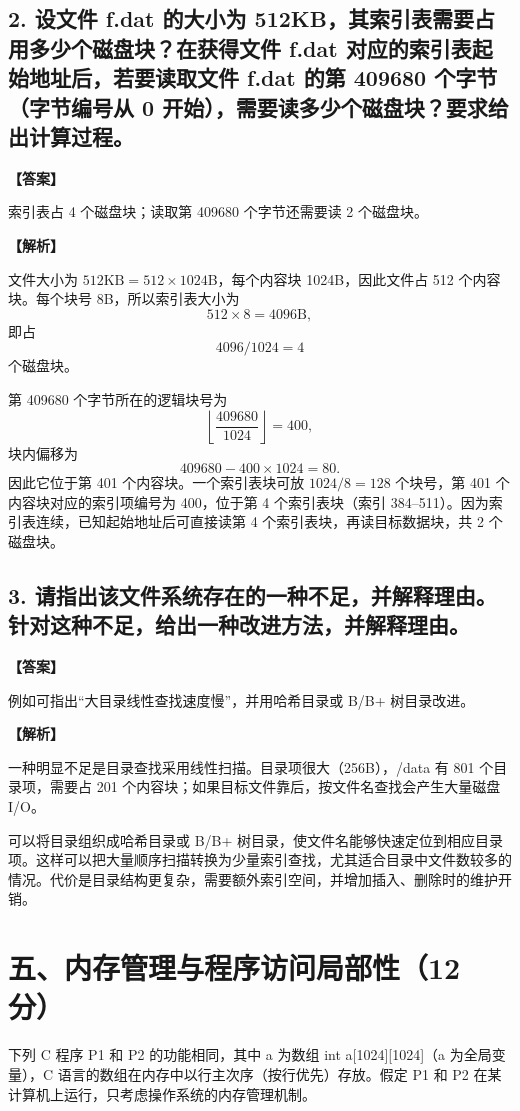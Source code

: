 \documentclass[UTF8,12pt]{ctexart}
\newenvironment{explanation}{\par\noindent\textbf{【解析】}\par\smallskip}{\par\medskip}
\newenvironment{answer}{\par\noindent\textbf{【答案】}\par\smallskip}{\par}
\begin{document}
\subsection*{2. 设文件 f.dat 的大小为 512KB，其索引表需要占用多少个磁盘块？在获得文件 f.dat 对应的索引表起始地址后，若要读取文件 f.dat 的第 409680 个字节（字节编号从 0 开始），需要读多少个磁盘块？要求给出计算过程。}
\begin{answer}
索引表占 4 个磁盘块；读取第 409680 个字节还需要读 2 个磁盘块。
\end{answer}

\begin{explanation}
文件大小为 $512\text{KB}=512\times1024$B，每个内容块 1024B，因此文件占 512 个内容块。每个块号 8B，所以索引表大小为
\[
512\times8=4096\text{B},
\]
即占
\[
4096/1024=4
\]
个磁盘块。

第 409680 个字节所在的逻辑块号为
\[
\left\lfloor\frac{409680}{1024}\right\rfloor=400,
\]
块内偏移为
\[
409680-400\times1024=80.
\]
因此它位于第 401 个内容块。一个索引表块可放 $1024/8=128$ 个块号，第 401 个内容块对应的索引项编号为 400，位于第 4 个索引表块（索引 384--511）。因为索引表连续，已知起始地址后可直接读第 4 个索引表块，再读目标数据块，共 2 个磁盘块。
\end{explanation}
\subsection*{3. 请指出该文件系统存在的一种不足，并解释理由。针对这种不足，给出一种改进方法，并解释理由。}
\begin{answer}
例如可指出“大目录线性查找速度慢”，并用哈希目录或 B/B+ 树目录改进。
\end{answer}

\begin{explanation}
一种明显不足是目录查找采用线性扫描。目录项很大（256B），/data 有 801 个目录项，需要占 201 个内容块；如果目标文件靠后，按文件名查找会产生大量磁盘 I/O。

可以将目录组织成哈希目录或 B/B+ 树目录，使文件名能够快速定位到相应目录项。这样可以把大量顺序扫描转换为少量索引查找，尤其适合目录中文件数较多的情况。代价是目录结构更复杂，需要额外索引空间，并增加插入、删除时的维护开销。
\end{explanation}
\section*{五、内存管理与程序访问局部性（12 分）}
下列 C 程序 P1 和 P2 的功能相同，其中 a 为数组 int a[1024][1024]（a 为全局变量），C 语言的数组在内存中以行主次序（按行优先）存放。假定 P1 和 P2 在某计算机上运行，只考虑操作系统的内存管理机制。
\end{document}
